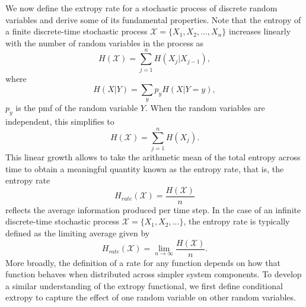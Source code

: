 \documentclass[pdflatex]{sn-jnl}%
\theoremstyle{thmstyleone}
\theoremstyle{thmstyletwo}%
\theoremstyle{thmstylethree}%
\begin{document}
We now define the extropy rate for a stochastic process of discrete random variables and derive some of its fundamental properties. Note that the entropy of a finite discrete-time stochastic process $\mathcal{X} = \{X_1, X_2, \ldots, X_n\}$ increases linearly with the number of random variables in the process as 
\begin{equation}
H(\mathcal{X})=\sum_{j=1}^{n}H(X_j|X_{j-1}),  
\end{equation}
where 
\begin{equation}
    H(X|Y)=\sum_{y}p_y H(X|Y=y), 
\end{equation}
${p_y}$ is the pmf of the random variable $Y$. When the random variables are independent, this simplifies to 
\begin{equation}
H(\mathcal{X})=\sum_{j=1}^{n}H(X_j).  
\end{equation}
This linear growth allows to take the arithmetic mean of the total entropy across time to obtain a meaningful quantity known as the entropy rate, that is, the entropy rate 
\begin{equation}
H_{rate}(\mathcal{X})=\frac{H(\mathcal{X})}{n}
\end{equation}
reflects the average information produced per time step. In the case of an infinite discrete-time stochastic process $\mathcal{X}=\{X_1, X_2, ...\}$, the entropy rate is typically defined as the limiting average given by 
\begin{equation}
H_{rate}(\mathcal{X})=\lim_{n\to \infty}\frac{H(\mathcal{X})}{n}.
\end{equation}
More broadly, the definition of a rate for any function depends on how that function behaves when distributed across simpler system components. To develop a similar understanding of the extropy functional, we first define conditional extropy to capture the effect of one random variable on other random variables.
\end{document}
